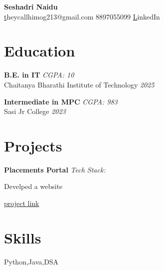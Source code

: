 \documentclass[a4paper,10pt]{article}
\begin{document}
\begin{center}
    {\huge \textbf{ Seshadri Naidu }} \\
    \vspace{5pt}
    \small \href{mailto:theycallhimog213@gmail.com } theycallhimog213@gmail.com \quad \textbullet{} 8897055099     
    \quad \textbullet{} \href{ www.google.com }LinkedIn 
  
\end{center}

\section*{Education}

\noindent
\textbf{ B.E. in IT } \hfill  \textit{ CGPA: 10 } \\
Chaitanya Bharathi Institute of Technology  \hfill  \textit{ 2025 } 
\vspace{0.3cm}

\noindent
\textbf{ Intermediate in MPC } \hfill  \textit{ CGPA: 983 } \\
Sasi Jr College  \hfill  \textit{ 2023 } 
\vspace{0.3cm}



\section*{Projects}
\noindent
\begin{compactitem}
    
        \item\textbf{ Placements Portal } \hfill \textit{ Tech Stack:  } 
        \begin{compactitem}
            
            \item Develped a website
            
        \end{compactitem}
        \href{ www.google.com }{project link}
    
\end{compactitem}



\section*{Skills}
\noindent
\begin{compactitem}
    
        \item Python,Java,DSA
    
\end{compactitem}
\end{document}
